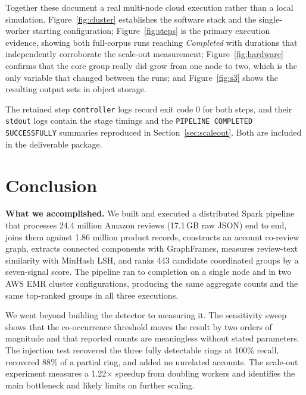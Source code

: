 \documentclass[12pt]{article}
\begin{document}
\clearpage

Together these document a real multi-node cloud execution rather than a local
simulation. Figure~\ref{fig:cluster} establishes the software stack and the
single-worker starting configuration; Figure~\ref{fig:steps} is the primary
execution evidence, showing both full-corpus runs reaching \emph{Completed}
with durations that independently corroborate the scale-out measurement;
Figure~\ref{fig:hardware} confirms that the core group really did grow from
one node to two, which is the only variable that changed between the runs; and
Figure~\ref{fig:s3} shows the resulting output sets in object storage.

The retained step \texttt{controller} logs record exit code 0 for both steps,
and their \texttt{stdout} logs contain the stage timings and the
\texttt{PIPELINE COMPLETED SUCCESSFULLY} summaries reproduced in
Section~\ref{sec:scaleout}. Both are included in the deliverable package.

\section{Conclusion}

\textbf{What we accomplished.} We built and executed a distributed Spark
pipeline that processes 24.4 million Amazon reviews (17.1\,GB raw JSON) end to
end, joins them against 1.86 million product records, constructs an account
co-review graph, extracts connected components with GraphFrames, measures
review-text similarity with MinHash LSH, and ranks 443 candidate coordinated
groups by a seven-signal score. The pipeline ran to completion on a single
node and in two AWS EMR cluster configurations, producing the same aggregate
counts and the same top-ranked groups in all three executions.

We went beyond building the detector to measuring it. The sensitivity sweep
shows that the co-occurrence threshold moves the result by two orders of
magnitude and that reported counts are meaningless without stated parameters.
The injection test recovered the three fully detectable rings at 100\% recall,
recovered 88\% of a partial ring, and added no unrelated accounts. The
scale-out experiment measures a 1.22$\times$ speedup from doubling workers and
identifies the main bottleneck and likely limits on further scaling.
\end{document}
